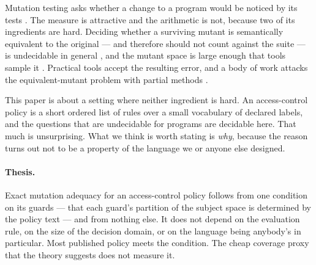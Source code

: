 \documentclass[11pt,a4paper]{article}
\theoremstyle{plain}
\theoremstyle{definition}
\theoremstyle{remark}
\begin{document}
Mutation testing asks whether a change to a program would be noticed by its tests
\cite{demillo1978hints}. The measure is attractive and the arithmetic is not, because two of
its ingredients are hard. Deciding whether a surviving mutant is semantically equivalent to
the original --- and therefore should not count against the suite --- is undecidable in
general \cite{budd1982two}, and the mutant space is large enough that tools sample it
\cite{jia2011analysis}. Practical tools accept the resulting error, and a body of work
attacks the equivalent-mutant problem with partial methods
\cite{papadakis2015trivial,offutt2001mutation}.

This paper is about a setting where neither ingredient is hard. An access-control policy is
a short ordered list of rules over a small vocabulary of declared labels, and the questions
that are undecidable for programs are decidable here. That much is unsurprising. What we
think is worth stating is \emph{why}, because the reason turns out not to be a property of
the language we or anyone else designed.

\paragraph{Thesis.} Exact mutation adequacy for an access-control policy follows from one
condition on its guards --- that each guard's partition of the subject space is determined
by the policy text --- and from nothing else. It does not depend on the evaluation rule, on
the size of the decision domain, or on the language being anybody's in particular. Most
published policy meets the condition. The cheap coverage proxy that the theory suggests does
not measure it.
\end{document}
